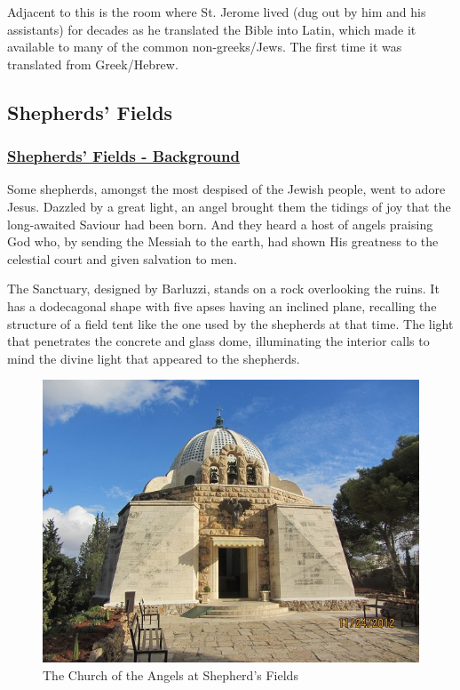 \documentclass[letterpaper]{report}
\begin{document}
Adjacent to this is the room where St. Jerome lived (dug out by him and his assistants) for decades as he translated the Bible into Latin, which made it available to many of the common non-greeks/Jews. The first time it was translated from Greek/Hebrew.

\clearpage
\subsection{Shepherds' Fields}
\begin{multicols}{2}

\subsubsection{\href{http://www.custodia.org/default.asp?id=1888}{
Shepherds' Fields - Background}}

Some shepherds, amongst the most despised of the Jewish people,
went to adore Jesus. Dazzled by a great light,
an angel brought them the tidings of joy that the long-awaited Saviour had
been born.
And they heard a host of angels praising God who,
by sending the Messiah to the earth,
had shown His greatness to the celestial court and given salvation to men.

The Sanctuary, designed by Barluzzi, stands on a rock overlooking the ruins.
It has a dodecagonal shape with five apses having an inclined plane,
recalling the structure of a field tent like the one used by the shepherds at 
that time.
The light that penetrates the concrete and glass dome,
illuminating the interior calls to mind the divine light that appeared to the 
shepherds.

\begin{figure}[H]
\centering
\label{fig:ChurchOfTheAngelsAtShepherdsFields}
\caption{The Church of the Angels at Shepherd's Fields}
\includegraphics[width=\columnwidth]{ChurchOfTheAngelsAtShepherdsFields}
\end{figure}

\end{multicols}
\end{document}
